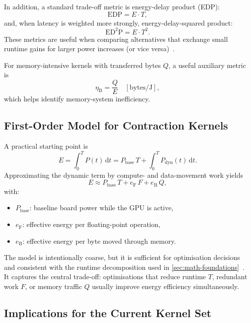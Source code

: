 In addition, a standard trade-off metric is energy-delay product (EDP):
\[
  \mathrm{EDP}=E\cdot T,
\]
and, when latency is weighted more strongly, energy-delay-squared product:
\[
  \mathrm{ED^2P}=E\cdot T^2.
\]
These metrics are useful when comparing alternatives that exchange small runtime
gains for larger power increases (or vice versa)~\cite{hager2016power-model}.

For memory-intensive kernels with transferred bytes $Q$, a useful auxiliary
metric is
\[
  \eta_{\mathrm{B}} = \frac{Q}{E}
  \quad [\text{bytes/J}],
\]
which helps identify memory-system inefficiency.

\subsection{First-Order Model for Contraction Kernels}

A practical starting point is
\[
  E=\int_0^T P(t)\,\mathrm{d}t
   =P_{\mathrm{base}}\,T + \int_0^T P_{\mathrm{dyn}}(t)\,\mathrm{d}t.
\]
Approximating the dynamic term by compute- and data-movement work yields
\[
  E \approx P_{\mathrm{base}}\,T + e_{\mathrm{F}}\,F + e_{\mathrm{B}}\,Q,
\]
with:
\begin{itemize}
  \item $P_{\mathrm{base}}$: baseline board power while the GPU is active,
  \item $e_{\mathrm{F}}$: effective energy per floating-point operation,
  \item $e_{\mathrm{B}}$: effective energy per byte moved through memory.
\end{itemize}

The model is intentionally coarse, but it is sufficient for optimisation
decisions and consistent with the runtime decomposition used in
\cref{sec:math-foundations}~\cite{williams2009roofline,hockney1988parallel}.
It captures the central trade-off: optimisations that
reduce runtime $T$, redundant work $F$, or memory traffic $Q$ usually improve
energy efficiency simultaneously.

\subsection{Implications for the Current Kernel Set}

